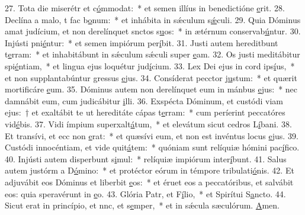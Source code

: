 27. Tota die miserétr et c\uline{ó}mmodat:~* et semen illíus in benedictióne \uline{e}rit.
28. Declína a malo, t fac b\uline{o}num:~* et inhábita in sǽculum s\uline{ǽ}culi.
29. Quia Dóminus amat judícium, et non derelínquet snctos s\uline{u}os:~* in ætérnum conservab\uline{ú}ntur.
30. Injústi pni\uline{é}ntur:~* et semen impiórum per\uline{í}bit.
31. Justi autem hereditbunt t\uline{e}rram:~* et inhabitábunt in sǽculum sǽculi super \uline{e}am.
32. Os justi meditábitur spi\uline{é}ntiam,~* et lingua ejus loquétur jud\uline{í}cium.
33. Lex Dei ejus in cord ips\uline{í}us,~* et non supplantabúntur gressus \uline{e}jus.
34. Consíderat pecctor j\uline{u}stum:~* et quærit mortificáre \uline{e}um.
35. Dóminus autem non derelínquet eum in mánbus \uline{e}jus:~* nec damnábit eum, cum judicábitur \uline{i}lli.
36. Exspécta Dóminum, et custódi viam ejus:~† et exaltábit te ut hereditáte cápas t\uline{e}rram:~* cum períerint peccatóres vid\uline{é}bis.
37. Vidi ímpium superxalt\uline{á}tum,~* et elevátum sicut cedros L\uline{í}bani.
38. Et transívi, et ecc non \uline{e}rat:~* et quæsívi eum, et non est invéntus locus \uline{e}jus.
39. Custódi innocéntiam, et vide quit\uline{á}tem:~* quóniam sunt relíquiæ hómini pac\uline{í}fico.
40. Injústi autem disperbunt s\uline{i}mul:~* relíquiæ impiórum inter\uline{í}bunt.
41. Salus autem justórm a D\uline{ó}mino:~* et protéctor eórum in témpore tribulati\uline{ó}nis.
42. Et adjuvábit eos Dóminus et liberbit \uline{e}os:~* et éruet eos a peccatóribus, et salvábit eos: quia speravérunt in \uline{e}o.
43. Glória Patr, et F\uline{í}lio,~* et Spirítui S\uline{a}ncto.
44. Sicut erat in princípio, et nnc, et s\uline{e}mper,~* et in sǽcula sæculórum. \uline{A}men.

